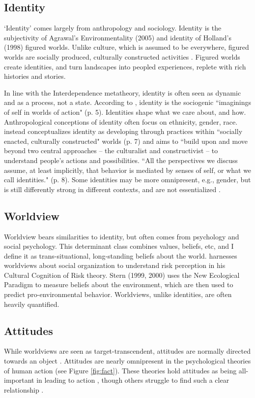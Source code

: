 \documentclass[12 pt]{article}
\begin{document}
		\subsection{Identity}
		`Identity' comes largely from anthropology and sociology. Identity is the subjectivity of Agrawal's Environmentality (2005) and identity of Holland's (1998) figured worlds.  Unlike culture, which is assumed to be everywhere, figured worlds are socially produced, culturally  constructed activities \parencite{Holland1998}. Figured worlds create identities, and turn landscapes into peopled experiences, replete with rich histories and stories.  
		
			
		In line with the Interdependence metatheory, identity is often seen as dynamic and as a process, not a state. According to \parencite{Holland1998}, identity is the sociogenic ``imaginings of self in worlds of action" (p. 5). Identities shape what we care about, and how. Anthropological conceptions of identity often focus on ethnicity, gender, race. \textcite{Holland1998} instead conceptualizes identity as developing through practices within ``socially enacted, culturally constructed" worlds (p. 7) and aims to ``build upon and move beyond two central approaches -- the culturalist and constructivist -- to understand people's actions and possibilities. ``All the perspectives we discuss assume, at least implicitly, that behavior is mediated by senses of self, or what we call identities." (p. 8).  Some identities may be more omnipresent, e.g., gender, but is still differently strong in different contexts, and are not essentialized \parencite{Agarwal1992}.
	
		\subsection{Worldview}
		Worldview bears similarities to identity, but often comes from psychology and social psychology. This determinant class combines values, beliefs, etc, and I define it as trans-situational, long-standing beliefs about the world. \textcite{Kahan2011} harnesses worldviews about social organization to understand risk perception in his Cultural Cognition of Risk theory. Stern (1999, 2000) uses the New Ecological Paradigm to measure beliefs about the environment, which are then used to predict pro-environmental behavior.  Worldviews, unlike identities, are often heavily quantified.  
		\subsection{Attitudes}
		While worldviews are seen as target-transcendent, attitudes are normally directed towards an object \parencite{Hitlin2004}.  Attitudes are nearly omnipresent in the psychological theories of human action (see Figure \ref{fig:fact}). These theories hold attitudes as being all-important in leading to action \parencite{Kraus1995}, though others struggle to find such a clear relationship \parencite{Sniehotta2014}. 
\end{document}
